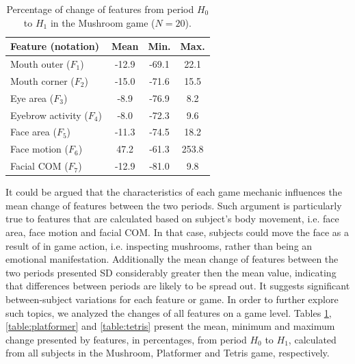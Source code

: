 \begin{table}
    \caption{Percentage of change of features from period $H_0$ to $H_1$ in the Mushroom game ($N=20$).}
    \label{table:mushroom}
    \centering
    \begin{threeparttable}
        \begin{tabular}{lccc}
            \hline
                \textbf{Feature (notation)} & \textbf{Mean} & \textbf{Min.} & \textbf{Max.} \\
            \hline
                Mouth outer ($F_1$)      & -12.9 & -69.1  &  22.1  \\
                Mouth corner ($F_2$)     & -15.0 & -71.6  &  15.5  \\
            \hline
                Eye area ($F_3$)         & -8.9  & -76.9  &  8.2   \\
                Eyebrow activity ($F_4$) & -8.0  & -72.3  &  9.6   \\
            \hline
                Face area ($F_5$)        & -11.3 & -74.5  &  18.2  \\
                Face motion ($F_6$)      & 47.2  & -61.3  &  253.8 \\
                Facial COM ($F_7$)       & -12.9 & -81.0  &  9.8   \\
            \hline
        \end{tabular}
        \begin{tablenotes}
          \small
          \item[]{}
        \end{tablenotes}
    \end{threeparttable}
\end{table}

It could be argued that the characteristics of each game mechanic influences the mean change of features between the two periods. Such argument is particularly true to features that are calculated based on subject's body movement, i.e. face area, face motion and facial COM. In that case, subjects could move the face as a result of in game action, i.e. inspecting mushrooms, rather than being an emotional manifestation. Additionally the mean change of features between the two periods presented SD considerably greater then the mean value, indicating that differences between periods are likely to be spread out. It suggests significant between-subject variations for each feature or game. In order to further explore such topics, we analyzed the changes of all features on a game level. Tables \ref{table:mushroom}, \ref{table:platformer} and \ref{table:tetris} present the mean, minimum and maximum change presented by features, in percentages, from period $H_0$ to $H_1$, calculated from all subjects in the Mushroom, Platformer and Tetris game, respectively.

